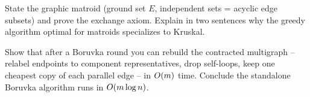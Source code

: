 \begin{exercise}
State the graphic matroid (ground set $E$, independent sets = acyclic edge subsets) and prove the exchange axiom. Explain in two sentences why the greedy algorithm optimal for matroids specializes to Kruskal.
\end{exercise}

\begin{exercise}
Show that after a Boruvka round you can rebuild the contracted multigraph -- relabel endpoints to component representatives, drop self-loops, keep one cheapest copy of each parallel edge -- in $O(m)$ time. Conclude the standalone Boruvka algorithm runs in $O(m\log n)$.
\end{exercise}
